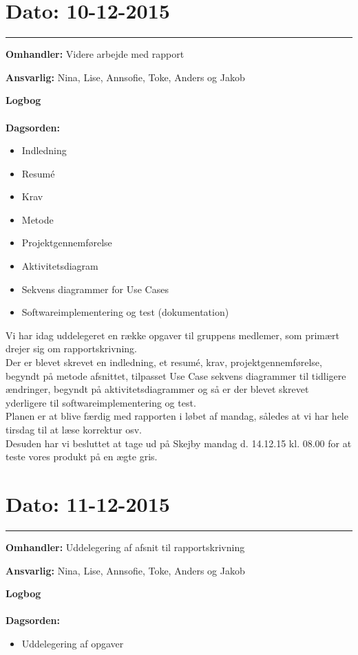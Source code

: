 	
	
\section{Dato: 10-12-2015 }
\hrule

\textbf{Omhandler:} Videre arbejde med rapport

\textbf{Ansvarlig:} Nina, Lise, Annsofie, Toke, Anders og Jakob

\textbf{Logbog}
\\
\\
\textbf{Dagsorden:}
\begin{itemize}
	\item Indledning
	\item Resumé
	\item Krav
	\item Metode
	\item Projektgennemførelse
	\item Aktivitetsdiagram
	\item Sekvens diagrammer for Use Cases
	\item Softwareimplementering og test (dokumentation)
\end{itemize}

Vi har idag uddelegeret en række opgaver til gruppens medlemer, som primært drejer sig om rapportskrivning. \\
Der er blevet skrevet en indledning, et resumé, krav, projektgennemførelse, begyndt på metode afsnittet, tilpasset Use Case sekvens diagrammer til tidligere ændringer, begyndt på aktivitetsdiagrammer og så er der blevet skrevet yderligere til softwareimplementering og test.\\
Planen er at blive færdig med rapporten i løbet af mandag, således at vi har hele tirsdag til at læse korrektur osv.\\
Desuden har vi besluttet at tage ud på Skejby mandag d. 14.12.15 kl. 08.00 for at teste vores produkt på en ægte gris. 


	
	
\section{Dato: 11-12-2015 }
\hrule

\textbf{Omhandler:} Uddelegering af afsnit til rapportskrivning

\textbf{Ansvarlig:} Nina, Lise, Annsofie, Toke, Anders og Jakob

\textbf{Logbog}
\\
\\
\textbf{Dagsorden:}
\begin{itemize}
	\item Uddelegering af opgaver
\end{itemize}

